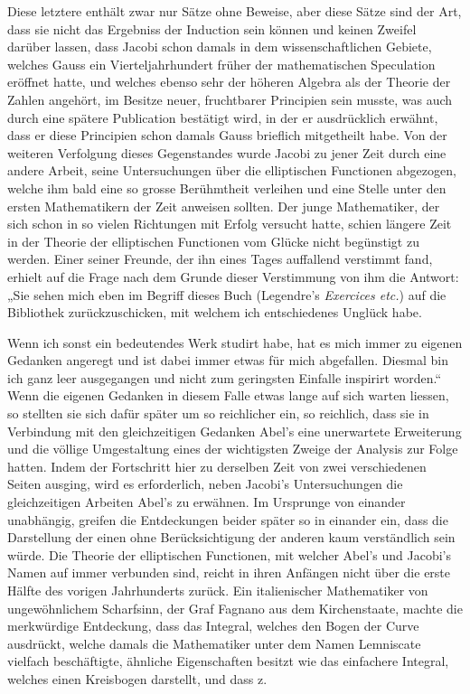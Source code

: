 \documentclass[11pt]{article}
\begin{document}
Diese letztere enthält zwar nur Sätze ohne Beweise, aber diese Sätze sind der Art, dass sie nicht das Ergebniss der Induction sein können und keinen Zweifel darüber lassen, dass Jacobi schon damals in dem wissenschaftlichen Gebiete, welches Gauss ein Vierteljahrhundert früher der mathematischen Speculation eröffnet hatte, und welches ebenso sehr der höheren Algebra als der Theorie der Zahlen angehört, im Besitze neuer, fruchtbarer Principien sein musste, was auch durch eine spätere Publication bestätigt wird, in der er ausdrücklich erwähnt, dass er diese Principien schon damals Gauss brieflich mitgetheilt habe. Von der weiteren Verfolgung dieses Gegenstandes wurde Jacobi zu jener Zeit durch eine andere Arbeit, seine Untersuchungen über die elliptischen Functionen abgezogen, welche ihm bald eine so grosse Berühmtheit verleihen und eine Stelle unter den ersten Mathematikern der Zeit anweisen sollten. Der junge Mathematiker, der sich schon in so vielen Richtungen mit Erfolg versucht hatte, schien längere Zeit in der Theorie der elliptischen Functionen vom Glücke nicht begünstigt zu werden. Einer seiner Freunde, der ihn eines Tages auffallend verstimmt fand, erhielt auf die Frage nach dem Grunde dieser Verstimmung von ihm die Antwort: „Sie sehen mich eben im Begriff dieses Buch (Legendre’s \emph{Exercices etc.}) auf die Bibliothek zurückzuschicken, mit welchem ich entschiedenes Unglück habe.

Wenn ich sonst ein bedeutendes Werk studirt habe, hat es mich immer zu eigenen Gedanken angeregt und ist dabei immer etwas für mich abgefallen. Diesmal bin ich ganz leer ausgegangen und nicht zum geringsten Einfalle inspirirt worden.“ Wenn die eigenen Gedanken in diesem Falle etwas lange auf sich warten liessen, so stellten sie sich dafür später um so reichlicher ein, so reichlich, dass sie in Verbindung mit den gleichzeitigen Gedanken Abel’s eine unerwartete Erweiterung und die völlige Umgestaltung eines der wichtigsten Zweige der Analysis zur Folge hatten. Indem der Fortschritt hier zu derselben Zeit von zwei verschiedenen Seiten ausging, wird es erforderlich, neben Jacobi’s Untersuchungen die gleichzeitigen Arbeiten Abel’s zu erwähnen. Im Ursprunge von einander unabhängig, greifen die Entdeckungen beider später so in einander ein, dass die Darstellung der einen ohne Berücksichtigung der anderen kaum verständlich sein würde. Die Theorie der elliptischen Functionen, mit welcher Abel’s und Jacobi’s Namen auf immer verbunden sind, reicht in ihren Anfängen nicht über die erste Hälfte des vorigen Jahrhunderts zurück. Ein italienischer Mathematiker von ungewöhnlichem Scharfsinn, der Graf Fagnano aus dem Kirchenstaate, machte die merkwürdige Entdeckung, dass das Integral, welches den Bogen der Curve ausdrückt, welche damals die Mathematiker unter dem Namen Lemniscate vielfach beschäftigte, ähnliche Eigenschaften besitzt wie das einfachere Integral, welches einen Kreisbogen darstellt, und dass z.
\end{document}
